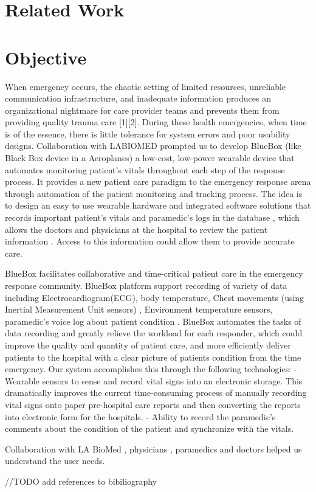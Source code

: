 \section{Related Work}

\section{Objective}
When emergency occurs, the chaotic setting of limited resources, unreliable communication infrastructure, and inadequate information produces an organizational nightmare for care provider teams and prevents them from providing quality trauma care [1][2]. 
During these health emergencies, when time is of the essence, there is little tolerance for system errors and poor usability designs. 
Collaboration with LABIOMED prompted us to develop BlueBox (like Black Box device in a Aeroplanes) a low-cost, low-power wearable device that automates monitoring patient’s vitals throughout each step of the response process. It provides a new patient care paradigm to the emergency response arena through automation of the patient monitoring and tracking process. The idea is to design an easy to use wearable hardware and integrated software solutions that records important  patient’s vitals and paramedic's logs in the database , which allows the doctors and physicians at the hospital to review the patient information . Access to this information could allow them to provide accurate care.

BlueBox facilitates collaborative and time-critical patient care in the emergency response community. BlueBox  platform support recording of variety of data including Electrocardiogram(ECG), body temperature, Chest movements (using Inertial Measurement Unit sensors) , Environment temperature sensors, paramedic’s voice log about patient condition . BlueBox automates the tasks of data recording and  greatly relieve the workload for each responder, which could improve the quality and quantity of patient care, and more efficiently deliver patients to the hospital with a clear picture of patients condition from the time emergency. Our system accomplishes this through the following technologies:
-	Wearable sensors to sense and record vital signs into an electronic storage. This dramatically improves the current time-consuming process of manually recording vital signs onto paper pre-hospital care reports and then converting the reports into electronic form for the hospitals.
-	Ability to record the paramedic’s comments about the condition of the patient and synchronize with the vitals.

Collaboration with LA BioMed , physicians , paramedics and doctors helped us understand the user needs.

//TODO add references to bibiliography